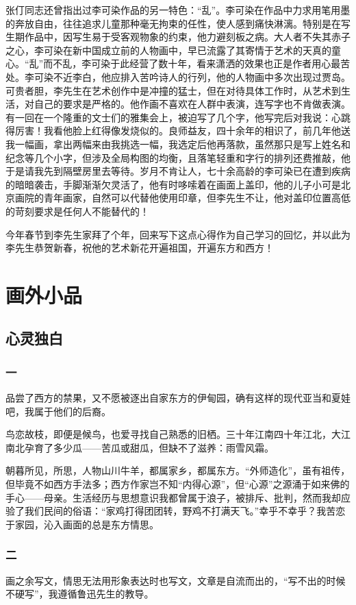 \documentclass{article}
\begin{document}
张仃同志还曾指出过李可染作品的另一特色：“乱”。李可染在作品中力求用笔用墨的奔放自由，往往追求儿童那种毫无拘束的任性，使人感到痛快淋漓。特别是在写生期作品中，因写生易于受客观物象的约束，他力避刻板之病。大人者不失其赤子之心，李可染在新中国成立前的人物画中，早已流露了其寄情于艺术的天真的童心。“乱”而不乱，李可染于此经营了数十年，看来潇洒的效果也正是作者用心最苦处。李可染不近李白，他应排入苦吟诗人的行列，他的人物画中多次出现过贾岛。可贵者胆，李先生在艺术创作中是冲撞的猛士，但在对待具体工作时，从艺术到生活，对自己的要求是严格的。他作画不喜欢在人群中表演，连写字也不肯做表演。有一回在一个隆重的文士们的雅集会上，被迫写了几个字，他写完后对我说：心跳得厉害！我看他脸上红得像发烧似的。良师益友，四十余年的相识了，前几年他送我一幅画，拿出两幅来由我挑选一幅，我选定后他再落款，虽然那只是写上姓名和纪念等几个小字，但涉及全局构图的均衡，且落笔轻重和字行的排列还费推敲，他于是请我先到隔壁房里去等待。岁月不肯让人，七十余高龄的李可染已在遭到疾病的暗暗袭击，手脚渐渐欠灵活了，他有时哆嗦着在画面上盖印，他的儿子小可是北京画院的青年画家，自然可以代替他使用印章，但李先生不让，他对盖印位置高低的苛刻要求是任何人不能替代的！

今年春节到李先生家拜了个年，回来写下这点心得作为自己学习的回忆，并以此为李先生恭贺新春，祝他的艺术新花开遍祖国，开遍东方和西方！
\section{画外小品}
\subsection{心灵独白}
\subsubsection{一}
品尝了西方的禁果，又不愿被逐出自家东方的伊甸园，确有这样的现代亚当和夏娃吧，我属于他们的后裔。

鸟恋故枝，即便是候鸟，也爱寻找自己熟悉的旧栖。三十年江南四十年江北，大江南北孕育了多少瓜——苦瓜或甜瓜，但缺不了滋养：雨雪风霜。

朝暮所见，所思，人物山川牛羊，都属家乡，都属东方。“外师造化”，虽有祖传，但毕竟不如西方手法多；西方作家岂不知“内得心源”，但“心源”之源涌于如来佛的手心——母亲。生活经历与思想意识我都曾属于浪子，被排斥、批判，然而我却应验了我们民间的俗语：“家鸡打得团团转，野鸡不打满天飞。”幸乎不幸乎？我苦恋于家园，沁入画面的总是东方情思。
\subsubsection{二}
画之余写文，情思无法用形象表达时也写文，文章是自流而出的，“写不出的时候不硬写”，我遵循鲁迅先生的教导。
\end{document}
